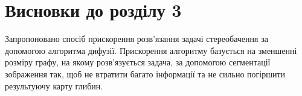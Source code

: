 
\section*{Висновки до розділу 3}

Запропоновано спосіб прискорення розв'язання задачі стереобачення
за допомогою алгоритма дифузії.
Прискорення алгоритму базується на зменшенні розміру графу,
на якому розв'язується задача, за допомогою сегментації зображення так,
щоб не втратити багато інформації та
не сильно погіршити результуючу карту глибин.
